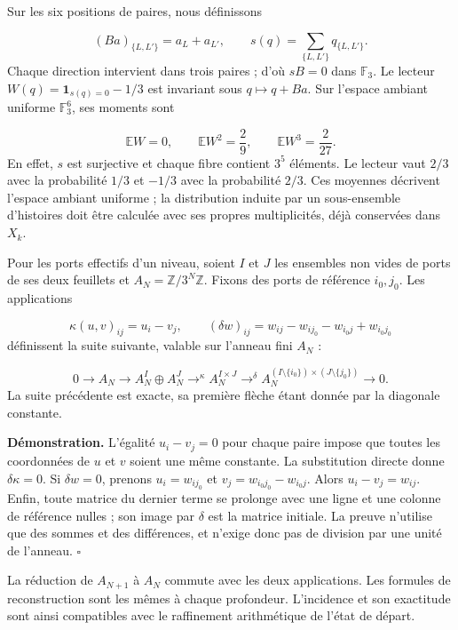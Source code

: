Sur les six positions de paires, nous définissons

\[
(Ba)_{\{L,L'\}}=a_L+a_{L'},
\qquad
s(q)=\sum_{\{L,L'\}}q_{\{L,L'\}}.
\]
Chaque direction intervient dans trois paires ; d'où \(sB=0\) dans \(\mathbb F_3\). Le lecteur \(W(q)=\mathbf1_{s(q)=0}-1/3\) est invariant sous \(q\mapsto q+Ba\). Sur l'espace ambiant uniforme \(\mathbb F_3^6\), ses moments sont

\[
\mathbb EW=0,\qquad
\mathbb EW^2=\frac29,\qquad
\mathbb EW^3=\frac2{27}.
\]
En effet, \(s\) est surjective et chaque fibre contient \(3^5\) éléments. Le lecteur vaut \(2/3\) avec la probabilité \(1/3\) et \(-1/3\) avec la probabilité \(2/3\). Ces moyennes décrivent l'espace ambiant uniforme ; la distribution induite par un sous-ensemble d'histoires doit être calculée avec ses propres multiplicités, déjà conservées dans \(X_k\).

Pour les ports effectifs d'un niveau, soient \(I\) et \(J\) les ensembles non vides de ports de ses deux feuillets et \(A_N=\mathbb Z/3^N\mathbb Z\). Fixons des ports de référence \(i_0,j_0\). Les applications

\[
\kappa(u,v)_{ij}=u_i-v_j,
\qquad
(\delta w)_{ij}=w_{ij}-w_{ij_0}-w_{i_0j}+w_{i_0j_0}
\]
définissent la suite suivante, valable sur l'anneau fini \(A_N\) :

\[
0\longrightarrow A_N\longrightarrow
A_N^I\oplus A_N^J\mathrel{\mathop{\longrightarrow}^{\kappa}}
A_N^{I\times J}\mathrel{\mathop{\longrightarrow}^{\delta}}
A_N^{(I\setminus\{i_0\})\times(J\setminus\{j_0\})}
\longrightarrow0.
\]
La suite précédente est exacte, sa première flèche étant donnée par la diagonale constante.

\textbf{Démonstration.} L’égalité \(u_i-v_j=0\) pour chaque paire impose que toutes les coordonnées de \(u\) et \(v\) soient une même constante. La substitution directe donne \(\delta\kappa=0\). Si \(\delta w=0\), prenons \(u_i=w_{ij_0}\) et \(v_j=w_{i_0j_0}-w_{i_0j}\). Alors \(u_i-v_j=w_{ij}\). Enfin, toute matrice du dernier terme se prolonge avec une ligne et une colonne de référence nulles ; son image par \(\delta\) est la matrice initiale. La preuve n’utilise que des sommes et des différences, et n’exige donc pas de division par une unité de l’anneau. \hfill\(\square\)

La réduction de \(A_{N+1}\) à \(A_N\) commute avec les deux applications. Les formules de reconstruction sont les mêmes à chaque profondeur. L’incidence et son exactitude sont ainsi compatibles avec le raffinement arithmétique de l’état de départ.


